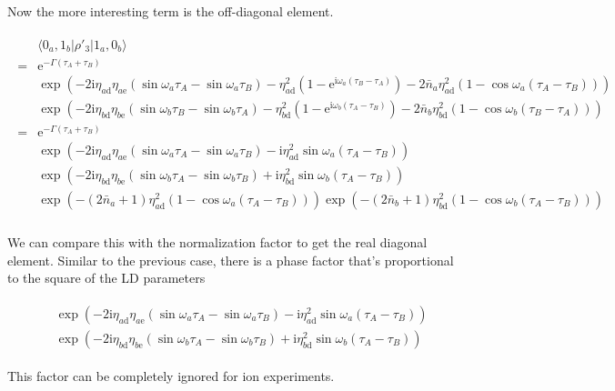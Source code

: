 \documentclass[10pt,fleqn]{article}
\newcommand{\ue}{\mathrm{e}}
\newcommand{\ui}{\mathrm{i}}
\newcommand{\eqar}[1]
{
  \begin{align}
    #1
  \end{align}
}
\newcommand{\paren}[1]{{\left({#1}\right)}}
\begin{document}
Now the more interesting term is the off-diagonal element.
\eqar{
  \begin{split}
    &\langle0_a,1_b|\rho'_3|1_a,0_b\rangle\\
    =&\ue^{-\Gamma\paren{\tau_A+\tau_B}}\\
    &\exp\paren{
      -2\ui\eta_{a\mathrm{d}}
      \eta_{a\mathrm{e}}\paren{\sin\omega_a\tau_{A}-\sin\omega_a\tau_{B}}
      -\eta_{a\mathrm{d}}^2\paren{1-\ue^{\ui\omega_a\paren{\tau_{B}-\tau_{A}}}}
      -2{\bar n_a}\eta_{a\mathrm{d}}^2\paren{1-\cos\omega_a\paren{\tau_{A}-\tau_{B}}}
      }\\
    &\exp\paren{
      -2\ui\eta_{b\mathrm{d}}
      \eta_{b\mathrm{e}}\paren{\sin\omega_b\tau_{B}-\sin\omega_b\tau_{A}}
      -\eta_{b\mathrm{d}}^2\paren{1-\ue^{\ui\omega_b\paren{\tau_{A}-\tau_{B}}}}
      -2{\bar n_b}\eta_{b\mathrm{d}}^2\paren{1-\cos\omega_b\paren{\tau_{B}-\tau_{A}}}
      }\\
    =&\ue^{-\Gamma\paren{\tau_A+\tau_B}}\\
    &\exp\paren{
      -2\ui\eta_{a\mathrm{d}}\eta_{a\mathrm{e}}
      \paren{\sin\omega_a\tau_{A}-\sin\omega_a\tau_{B}}
      -\ui\eta_{a\mathrm{d}}^2\sin\omega_a\paren{\tau_{A}-\tau_{B}}
      }\\
    &\exp\paren{
      -2\ui\eta_{b\mathrm{d}}\eta_{b\mathrm{e}}
      \paren{\sin\omega_b\tau_{A}-\sin\omega_b\tau_{B}}
      +\ui\eta_{b\mathrm{d}}^2\sin\omega_b\paren{\tau_{A}-\tau_{B}}
      }\\
    &\exp\paren{
      -\paren{2{\bar n_a}+1}\eta_{a\mathrm{d}}^2\paren{1-\cos\omega_a\paren{\tau_{A}-\tau_{B}}}
      }
      \exp\paren{
      -\paren{2{\bar n_b}+1}\eta_{b\mathrm{d}}^2\paren{1-\cos\omega_b\paren{\tau_{A}-\tau_{B}}}
      }\\
  \end{split}
}
We can compare this with the normalization factor to get the real diagonal element.
Similar to the previous case, there is a phase factor that's proportional
to the square of the LD parameters
\eqar{
  \begin{split}
    &\exp\paren{
    -2\ui\eta_{a\mathrm{d}}\eta_{a\mathrm{e}}
    \paren{\sin\omega_a\tau_{A}-\sin\omega_a\tau_{B}}
    -\ui\eta_{a\mathrm{d}}^2\sin\omega_a\paren{\tau_{A}-\tau_{B}}
    }\\
    &\exp\paren{
    -2\ui\eta_{b\mathrm{d}}\eta_{b\mathrm{e}}
    \paren{\sin\omega_b\tau_{A}-\sin\omega_b\tau_{B}}
    +\ui\eta_{b\mathrm{d}}^2\sin\omega_b\paren{\tau_{A}-\tau_{B}}
    }
  \end{split}
}
This factor can be completely ignored for ion experiments.\\
\end{document}
